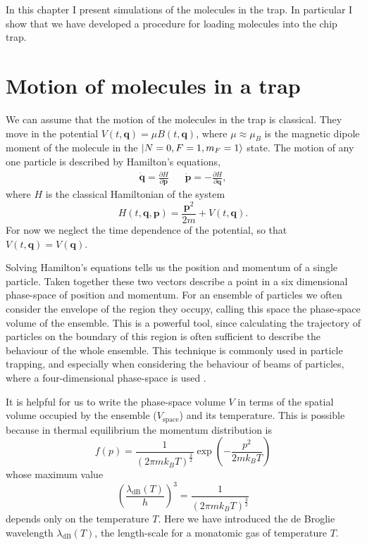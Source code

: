 In this chapter I present simulations of the molecules in the trap. In
particular I show that we have developed a procedure for loading molecules into
the chip trap.

\section{Motion of molecules in a trap}
\label{sim:motion}

We can assume that the motion of the molecules in the trap is classical. They
move in the potential $V(t, \mathbf{q}) = \mu B(t, \mathbf{q})$, where
$\mu\approx\mu_B$ is the magnetic dipole moment of the molecule in the
$\ket{N=0,F=1,m_F=1}$ state.  The motion of any one particle is described by Hamilton's
equations,~\cite{Lichtenberg1969}
%
\begin{align}
  \label{sim:eq:hamilton}
  \dot{\mathbf{q}} =  \frac{\partial H}{\partial \mathbf{p}} &&
  \dot{\mathbf{p}} = -\frac{\partial H}{\partial \mathbf{q}},
\end{align}
%
where $H$ is the classical Hamiltonian of the system
\begin{equation}
  H(t, \mathbf{q}, \mathbf{p}) = \frac{\mathbf{p}^2}{2m} + V(t, \mathbf{q}).
\end{equation}
For now we neglect the time dependence of the potential, so that $V(t,
\mathbf{q}) = V(\mathbf{q})$.

Solving Hamilton's equations tells us the position and momentum of a single
particle. Taken together these two vectors describe a point in a six
dimensional phase-space of position and momentum.
%
For an ensemble of particles we often consider the envelope of the region they
occupy, calling this space the phase-space volume of the ensemble. This is a
powerful tool, since calculating the trajectory of particles on the boundary of
this region is often sufficient to describe the behaviour of the whole
ensemble. This technique is commonly used in particle trapping, and especially
when considering the behaviour of beams of particles, where a four-dimensional
phase-space is used \cite{Hand1998, Lichtenberg1969}.

It is helpful for us to write the phase-space volume $V$ in terms of the
spatial volume occupied by the ensemble ($V_\text{space}$) and its temperature.
This is possible because in thermal equilibrium the momentum distribution is 
%
\begin{equation}
  f(p) = \frac{1}{(2 \pi m k_B T)^\frac{3}{2}}\exp(-\frac{p^2}{2 m k_B T})
\end{equation}
%
whose maximum value
%
\begin{equation}
  \left(\frac{\lambda_\text{dB}(T)}{h}\right)^3 = \frac{1}{(2 \pi m k_B
  T)^\frac{3}{2}}
\end{equation}
%
depends only on the temperature $T$. Here we have introduced the de Broglie
wavelength $\lambda_\text{dB}(T)$, the length-scale for a monatomic gas of
temperature $T$.~\cite{blundell2}

